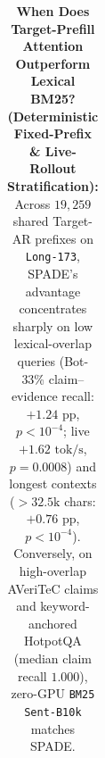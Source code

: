 \begin{table}[t]
{\begin{tabular}{lcccccr}
\bottomrule
\end{tabular}%
}
\caption{\textbf{When Does Target-Prefill Attention Outperform Lexical BM25? (Deterministic Fixed-Prefix \& Live-Rollout Stratification):} Across $19,259$ shared Target-AR prefixes on \texttt{Long-173}, SPADE's advantage concentrates sharply on low lexical-overlap queries (Bot-33\% claim--evidence recall: $+1.24\text{ pp}$, $p < 10^{-4}$; live $+1.62\text{ tok/s}$, $p = 0.0008$) and longest contexts ($> 32.5\text{k}$ chars: $+0.76\text{ pp}$, $p < 10^{-4}$). Conversely, on high-overlap AVeriTeC claims and keyword-anchored HotpotQA (median claim recall $1.000$), zero-GPU \texttt{BM25 Sent-B10k} matches SPADE.}
\label{tab:spade_vs_bm25_stratified}
\end{table}
